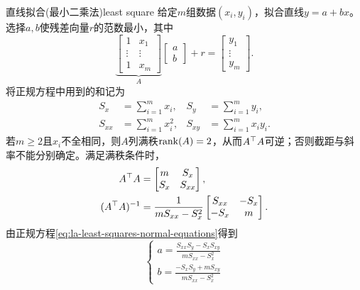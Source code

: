 \begin{example}{直线拟合(最小二乘法)}{least square}
	给定$m$组数据$(x_i,y_i)$，拟合直线$y = a + bx$。选择$a,b$使残差向量$r$的范数最小，其中
	\[
		\underbrace{\begin{bmatrix}
			1&x_1\\\vdots&\vdots\\1&x_m
		\end{bmatrix}}_{A}
		\begin{bmatrix}
			a\\b
		\end{bmatrix} + r =
		\begin{bmatrix}
			y_1\\\vdots\\y_m
		\end{bmatrix}.
	\]
	将正规方程中用到的和记为
	\begin{align*}
		S_x &= \sum_{i=1}^m x_i,      & S_y &= \sum_{i=1}^m y_i,\\
		S_{xx} &= \sum_{i=1}^m x_i^2, & S_{xy} &= \sum_{i=1}^m x_i y_i.
	\end{align*}
	若$m \geq 2$且$x_i$不全相同，则$A$列满秩$\operatorname{rank}(A) = 2$，从而$A^\top A$可逆；否则截距与斜率不能分别确定。满足满秩条件时，
	\begin{align*}
		A^\top A &=
		\begin{bmatrix}
			m&S_x\\
			S_x&S_{xx}
		\end{bmatrix},\\
		(A^\top A)^{-1} &= \frac1{mS_{xx} - S_x^2}
		\begin{bmatrix}
			S_{xx}&-S_x\\
			-S_x&m
		\end{bmatrix}.
	\end{align*}
	由正规方程\eqref{eq:la-least-squares-normal-equations}得到
	\begin{equation}
		\begin{cases}
			a = \frac{S_{xx}S_y - S_xS_{xy}}{mS_{xx} - S_x^2}\\[2ex]
			b = \frac{-S_xS_y + mS_{xy}}{mS_{xx} - S_x^2}
		\end{cases}
	\end{equation}

\end{example}
